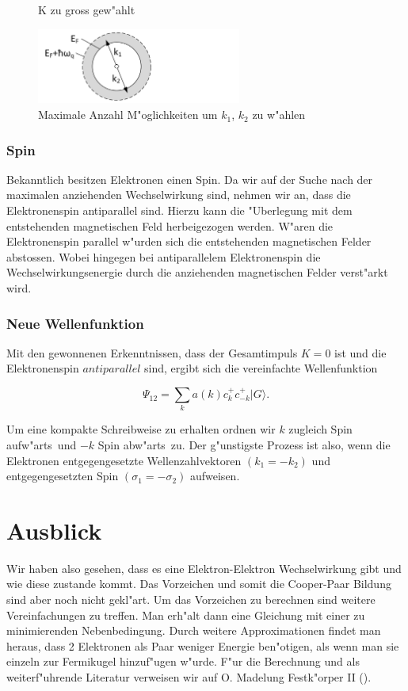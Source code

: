 \begin{refsection}
\begin{figure}
\caption{K zu gross gew"ahlt
\label{supraleitung:kRaum_06}}
\end{figure}
\begin{figure}	
\centering
\includegraphics[width=0.6\textwidth]{supraleitung/kGraphic_09.png} %
\caption{Maximale Anzahl M"oglichkeiten um $k_1$, $k_2$ zu w"ahlen
\label{supraleitung:kRaum_09}}
\end{figure}

\subsubsection{Spin}
Bekanntlich besitzen Elektronen einen Spin. Da wir auf der Suche nach der maximalen anziehenden Wechselwirkung sind, nehmen wir an, dass die Elektronenspin antiparallel sind. Hierzu kann die "Uberlegung mit dem entstehenden magnetischen Feld herbeigezogen werden. W"aren die Elektronenspin parallel w"urden sich die entstehenden magnetischen Felder abstossen. Wobei hingegen bei antiparallelem Elektronenspin die Wechselwirkungsenergie durch die anziehenden magnetischen Felder verst"arkt wird.

\subsubsection{Neue Wellenfunktion}
Mit den gewonnenen Erkenntnissen, dass der Gesamtimpuls $K=0$ ist und die Elektronenspin $antiparallel$ sind, ergibt sich die vereinfachte Wellenfunktion

\[
\Psi_{12}=\sum \limits_{k} a(k)c^+_{k}c^+_{-k}|G\rangle.
\]

Um eine kompakte Schreibweise zu erhalten ordnen wir $k$ zugleich \glqq Spin aufw"arts\grqq~und $-k$ \glqq Spin abw"arts\grqq~zu.
Der g"unstigste Prozess ist also, wenn die Elektronen entgegengesetzte Wellenzahlvektoren $(k_1 = -k_2)$ und entgegengesetzten Spin $(\sigma_1 = -\sigma_2)$ aufweisen.

\section{Ausblick}
Wir haben also gesehen, dass es eine Elektron-Elektron Wechselwirkung gibt und wie diese zustande kommt. Das Vorzeichen und somit die Cooper-Paar Bildung sind aber noch nicht gekl"art. Um das Vorzeichen zu berechnen sind weitere Vereinfachungen zu treffen. Man erh"alt dann eine Gleichung mit einer zu minimierenden Nebenbedingung. Durch weitere Approximationen findet man heraus, dass 2 Elektronen als Paar weniger Energie ben"otigen, als wenn man sie einzeln zur Fermikugel hinzuf"ugen w"urde. F"ur die Berechnung und als weiterf"uhrende Literatur verweisen wir auf O. Madelung Festk"orper II (\cite{skript:madelung1}).



\end{refsection}

